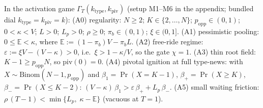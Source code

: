 %

\begin{assumption}\label{ass:bundle}
In the activation game $\Gamma_T(k_{\mathrm{type}},k_{\mathrm{piv}})$ (setup M1--M6 in the
appendix; bundled dial $k_{\mathrm{type}}=k_{\mathrm{piv}}=k$):
\textup{(A0)} regularity: $N\ge 2$; $K\in\{2,\dots,N\}$; $p_{\mathrm{opp}}\in(0,1)$;
$0<\kappa<V$; $L>0$; $L_p>0$; $\rho\ge 0$; $\pi_b\in(0,1)$; $\xi\in(0,1]$.
\textup{(A1)} pessimistic pooling: $0\le\mathbb E<\kappa$, where
$\mathbb E:=(1-\pi_b)V-\pi_b L$.
\textup{(A2)} free-ride regime: $\varepsilon:=\xi V-(V-\kappa)>0$, i.e.\ $\xi>1-\kappa/V$, so
the gate $\chi=1$.
\textup{(A3)} thin root field: $K-1\ge p_{\mathrm{opp}}N$, so $\mathrm{piv}(0)=0$.
\textup{(A4)} pivotal ignition at full type-news: with $X\sim\mathrm{Binom}(N-1,
p_{\mathrm{opp}})$ and $\beta_1=\Pr(X=K-1)$, $\beta_+=\Pr(X\ge K)$, $\beta_-=\Pr(X\le K-2)$:
$(V-\kappa)\,\beta_1>\varepsilon\,\beta_++L_p\,\beta_-$.
\textup{(A5)} small waiting friction: $\rho\,(T-1)<\min\{L_p,\;\kappa-\mathbb E\}$ (vacuous at
$T=1$).
\end{assumption}

